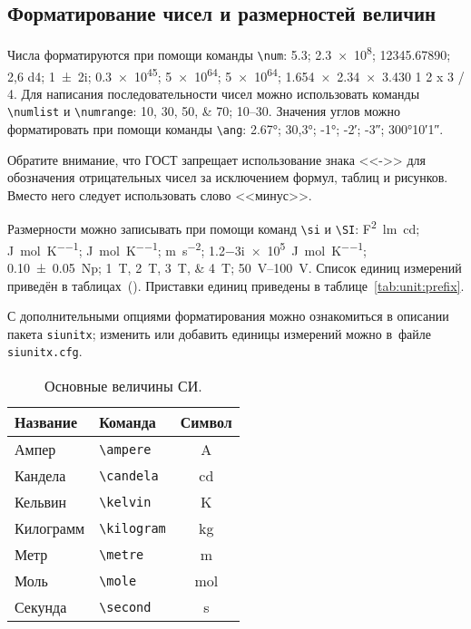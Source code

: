 \subsection{Форматирование чисел и размерностей величин}\label{sec:units}

Числа форматируются при помощи команды \verb|\num|:
\num{5,3};
\num{2,3e8};
\num{12345,67890};
\num{2,6 d4};
\num{1+-2i};
\num{.3e45};
\num[exponent-base=2]{5 e64};
\num[exponent-base=2,exponent-to-prefix]{5 e64};
\num{1.654 x 2.34 x 3.430}
\num{1 2 x 3 / 4}.
Для написания последовательности чисел можно использовать команды \verb|\numlist| и \verb|\numrange|:
\numlist{10;30;50;70}; \numrange{10}{30}.
Значения углов можно форматировать при помощи команды \verb|\ang|:
\ang{2.67};
\ang{30,3};
\ang{-1;;};
\ang{;-2;};
\ang{;;-3};
\ang{300;10;1}.

Обратите внимание, что ГОСТ запрещает использование знака <<->> для обозначения отрицательных чисел
за исключением формул, таблиц и рисунков.
Вместо него следует использовать слово <<минус>>.

Размерности можно записывать при помощи команд \verb|\si| и \verb|\SI|:
\si{\farad\squared\lumen\candela};
\si{\joule\per\mole\per\kelvin};
\si[per-mode = symbol-or-fraction]{\joule\per\mole\per\kelvin};
\si{\metre\per\second\squared};
\SI{1.2-3i e5}{\joule\per\mole\per\kelvin};
\SI{0.10(5)}{\neper};
\SIlist{1;2;3;4}{\tesla};
\SIrange{50}{100}{\volt}.
Список единиц измерений приведён в таблицах~().
Приставки единиц приведены в таблице~\ref{tab:unit:prefix}.

С дополнительными опциями форматирования можно ознакомиться в описании пакета \texttt{siunitx};
изменить или добавить единицы измерений можно в~файле \texttt{siunitx.cfg}.

\begin{table}
    \caption{Основные величины СИ.}\label{tab:unit:base}
    \centering
    \begin{tabular}{llc}
        \toprule
        Название  & Команда                & Символ         \\
        \midrule
        Ампер     & \verb|\ampere| & \si{\ampere}   \\
        Кандела   & \verb|\candela| & \si{\candela}  \\
        Кельвин   & \verb|\kelvin| & \si{\kelvin}   \\
        Килограмм & \verb|\kilogram| & \si{\kilogram} \\
        Метр      & \verb|\metre| & \si{\metre}    \\
        Моль      & \verb|\mole| & \si{\mole}     \\
        Секунда   & \verb|\second| & \si{\second}   \\
        \bottomrule
    \end{tabular}
\end{table}

